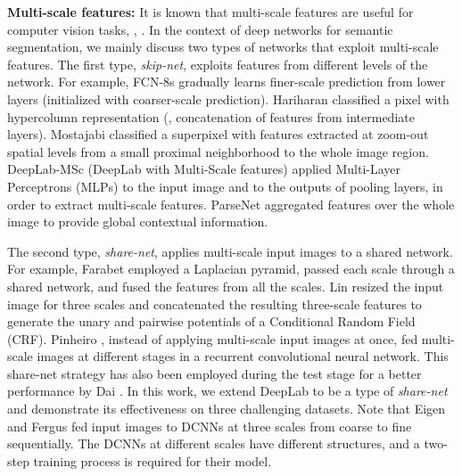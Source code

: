 \textbf{Multi-scale features:} It is known that multi-scale features are useful for computer vision tasks, \eg, \cite{florack1996gaussian, arbelaez2011contour}. %
In the context of deep networks for semantic segmentation, we mainly discuss two types of networks that exploit multi-scale features. The first type, {\it skip-net}, exploits features from different levels of the network. For example, FCN-8s \cite{long2014fully} gradually learns finer-scale prediction from lower layers (initialized with coarser-scale prediction). Hariharan \etal \cite{hariharan2014hypercolumns} classified a pixel with hypercolumn representation (\ie, concatenation of
features from intermediate layers). Mostajabi \etal \cite{mostajabi2014feedforward} classified a superpixel with features extracted at zoom-out spatial levels from a small proximal neighborhood to the whole image region. DeepLab-MSc (DeepLab with Multi-Scale features) \cite{chen2014semantic} applied Multi-Layer Perceptrons (MLPs) to the input image and to the outputs of pooling layers, in order to extract multi-scale features. ParseNet \cite{liu2015parsenet} aggregated features over the whole image to provide global contextual information. 

The second type, {\it share-net}, applies multi-scale input images to a shared network. For example, Farabet \etal \cite{farabet2013learning} employed a Laplacian pyramid, passed each scale through a shared network, and fused the features from all the scales. Lin \etal \cite{lin2015efficient} resized the input image for three scales and concatenated the resulting three-scale features to generate the unary and pairwise potentials of a Conditional Random Field (CRF). Pinheiro \etal
\cite{pinheiro2013recurrent}, instead of applying multi-scale input images at once, fed multi-scale images at different stages in a recurrent convolutional neural network. This share-net strategy has also been employed during the test stage for a better performance by Dai \etal \cite{dai2015boxsup}. In this work, we extend DeepLab \cite{chen2014semantic} to be a type of {\it share-net} and demonstrate its effectiveness on three challenging datasets. Note that Eigen and Fergus
\cite{eigen2014predicting} fed input images to DCNNs at three scales from coarse to fine sequentially. The DCNNs at different scales have different structures, and a two-step training process is required for their model.


